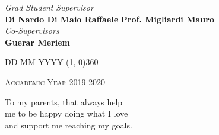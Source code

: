 \documentclass[a4paper, 12pt, twoside, openright]{book}
\newenvironment{abstract}{\cleardoublepage \null \vfill \begin{center}\bfseries\abstractname \end{center}}{\vfill\null}
\begin{document}
\begin{titlepage}
\vfill
\begin{normalsize}
\begin{flushleft}
  \hspace{55pt} \textit{Grad Student} \hspace{120pt} \textit{Supervisor}\\
  \vspace{5pt}
  \hspace{25pt} \large{\textbf{\footnotesize{Di Nardo Di Maio Raffaele}}} \hspace{55pt} \large{\textbf{\footnotesize{Prof. Migliardi Mauro}}}\\
  \vspace{50pt}
  \hspace{240pt} \normalsize{\textit{Co-Supervisors}}\\
  \vspace{5pt}
  \hspace{242pt} \large{\textbf{\footnotesize{Guerar Meriem}}}
\end{flushleft}
\end{normalsize}

\vfill
\begin{center}
\textsc{DD-MM-YYYY}
\hspace{-0.2cm}
\line(1, 0){360}

\textsc{Accademic Year 2019-2020}
\end{center}
\end{titlepage}


\cleardoublepage %
\thispagestyle{empty} %

\null
\vspace{2cm}
\begin{flushright}
  To my parents, that always help\\
 me to be happy doing what I love\\
and support me reaching my goals.
\end{flushright}
\vfill
\begin{quote}
  \textit{}
\end{quote}
\vfill
\null


%
\begingroup %
  \makeatletter
  \let\ps@plain\ps@empty
  \makeatother
  \tableofcontents  
  \clearpage
\endgroup

\mainmatter
%
\end{document}
